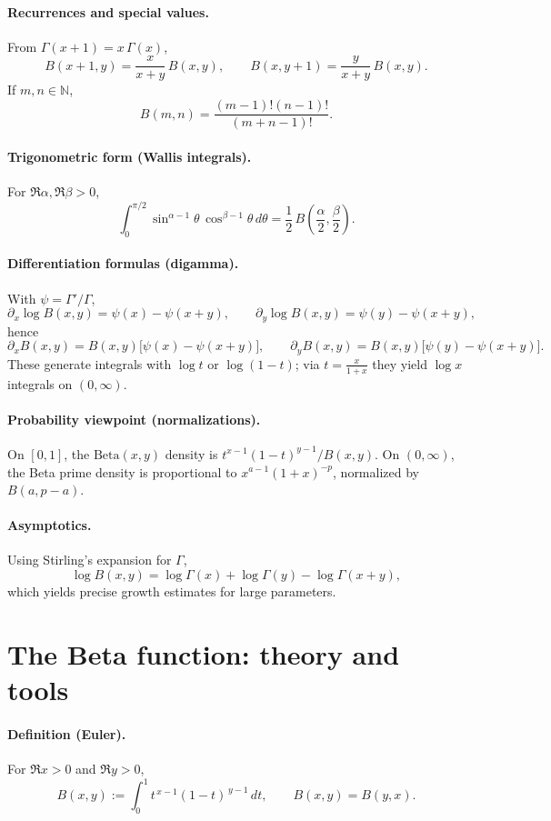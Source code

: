 \documentclass[12pt,a4paper]{article}
\begin{document}
\paragraph{Recurrences and special values.}
From $\Gamma(x+1)=x\,\Gamma(x)$,
\[
B(x+1,y)=\frac{x}{x+y}\,B(x,y),\qquad
B(x,y+1)=\frac{y}{x+y}\,B(x,y).
\]
If $m,n\in\mathbb{N}$,
\[
B(m,n)=\frac{(m-1)!(n-1)!}{(m+n-1)!}.
\]

\paragraph{Trigonometric form (Wallis integrals).}
For $\Re \alpha,\Re \beta>0$,
\[
\int_{0}^{\pi/2}\sin^{\alpha-1}\theta\,\cos^{\beta-1}\theta\,d\theta
=\frac{1}{2}\,B\!\left(\frac{\alpha}{2},\frac{\beta}{2}\right).
\]

\paragraph{Differentiation formulas (digamma).}
With $\psi=\Gamma'/\Gamma$,
\[
\partial_x\log B(x,y)=\psi(x)-\psi(x+y),\qquad
\partial_y\log B(x,y)=\psi(y)-\psi(x+y),
\]
hence
\[
\partial_x B(x,y)=B(x,y)\bigl[\psi(x)-\psi(x+y)\bigr],\qquad
\partial_y B(x,y)=B(x,y)\bigl[\psi(y)-\psi(x+y)\bigr].
\]
These generate integrals with $\log t$ or $\log(1-t)$; via $t=\frac{x}{1+x}$ they yield
$\log x$ integrals on $(0,\infty)$.

\paragraph{Probability viewpoint (normalizations).}
On $[0,1]$, the $\mathrm{Beta}(x,y)$ density is $t^{x-1}(1-t)^{y-1}/B(x,y)$.
On $(0,\infty)$, the Beta prime density is proportional to $x^{a-1}(1+x)^{-p}$, normalized by $B(a,p-a)$.

\paragraph{Asymptotics.}
Using Stirling’s expansion for $\Gamma$,
\[
\log B(x,y)=\log\Gamma(x)+\log\Gamma(y)-\log\Gamma(x+y),
\]
which yields precise growth estimates for large parameters.

\section*{The Beta function: theory and tools}

\paragraph{Definition (Euler).}
For $\Re x>0$ and $\Re y>0$,
\[
B(x,y):=\int_{0}^{1} t^{\,x-1}(1-t)^{\,y-1}\,dt,
\qquad B(x,y)=B(y,x).
\]
\end{document}
